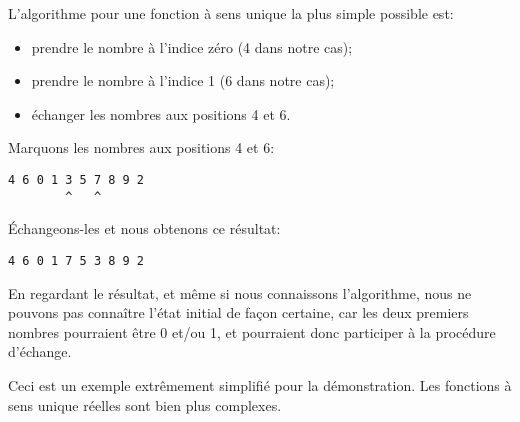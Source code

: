 L'algorithme pour une fonction à sens unique la plus simple possible est:

\begin{itemize}
\item prendre le nombre à l'indice zéro (4 dans notre cas);
\item prendre le nombre à l'indice 1 (6 dans notre cas);
\item échanger les nombres aux positions 4 et 6.
\end{itemize}

Marquons les nombres aux positions 4 et 6:

\begin{lstlisting}
4 6 0 1 3 5 7 8 9 2
        ^   ^
\end{lstlisting}

Échangeons-les et nous obtenons ce résultat:

\begin{lstlisting}
4 6 0 1 7 5 3 8 9 2
\end{lstlisting}

En regardant le résultat, et même si nous connaissons l'algorithme, nous ne pouvons
pas connaître l'état initial de façon certaine, car les deux premiers nombres pourraient
être 0 et/ou 1, et pourraient donc participer à la procédure d'échange.

Ceci est un exemple extrêmement simplifié pour la démonstration. Les fonctions à
sens unique réelles sont bien plus complexes.
